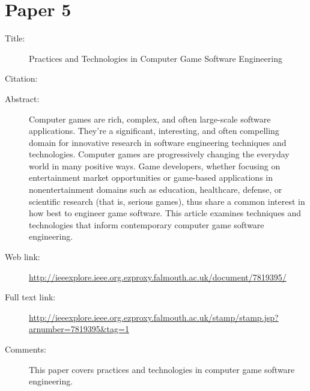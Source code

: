 \documentclass{scrartcl}
\begin{document}
\section*{Paper 5}
\begin{description}
\item[Title:] Practices and Technologies in Computer Game Software Engineering
\item[Citation:] \cite{ComputerGameSE}
\item[Abstract:] Computer games are rich, complex, and often large-scale software applications. They're a significant, interesting, and often compelling domain for innovative research in software engineering techniques and technologies. Computer games are progressively changing the everyday world in many positive ways. Game developers, whether focusing on entertainment market opportunities or game-based applications in nonentertainment domains such as education, healthcare, defense, or scientific research (that is, serious games), thus share a common interest in how best to engineer game software. This article examines techniques and technologies that inform contemporary computer game software engineering.
\item[Web link:] \url{http://ieeexplore.ieee.org.ezproxy.falmouth.ac.uk/document/7819395/}
\item[Full text link:] \url{http://ieeexplore.ieee.org.ezproxy.falmouth.ac.uk/stamp/stamp.jsp?arnumber=7819395&tag=1}
\item[Comments:] This paper covers practices and technologies in computer game software engineering.
\end{description}
\end{document}
